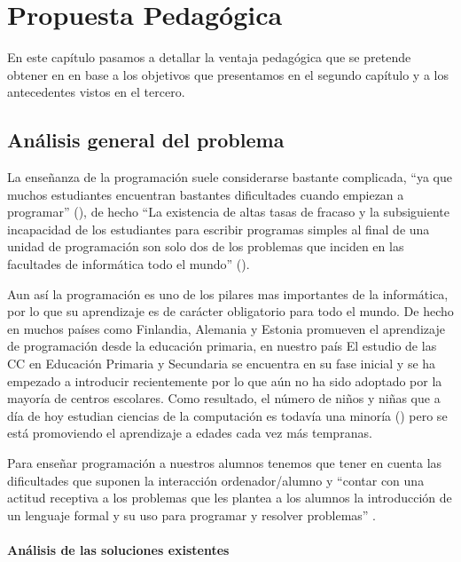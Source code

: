 \chapter{Propuesta Pedagógica}

En este capítulo pasamos a detallar la ventaja pedagógica que se pretende obtener en en base a los objetivos que presentamos en el segundo capítulo y a los antecedentes vistos en el tercero.

\section{Análisis general del problema}

La enseñanza de la programación suele considerarse bastante complicada, ``ya que muchos estudiantes encuentran bastantes dificultades cuando empiezan a programar'' (\cite{rubio_uso_2018}), de hecho ``La existencia de altas tasas de fracaso y la subsiguiente incapacidad de los estudiantes para escribir programas simples al final de una unidad de programación son solo dos de los problemas que inciden en las facultades de informática todo el mundo'' (\cite{bruce_contemporary_nodate}).

\bigskip
Aun así la programación es uno de los pilares mas importantes de la informática, por lo que su aprendizaje es de carácter obligatorio para todo el mundo. De hecho en muchos países como Finlandia, Alemania y Estonia promueven el aprendizaje de programación desde la educación primaria, en nuestro país El estudio de las CC en Educación Primaria y Secundaria se encuentra en su fase inicial y se ha
empezado a introducir recientemente por lo que aún no ha sido adoptado por la mayoría de centros escolares. Como resultado, el número de niños y niñas que a día de hoy estudian ciencias de la computación es
todavía una minoría (\cite{fecyt_educacion_2016}) pero se está promoviendo el aprendizaje a edades cada vez más tempranas.

\bigskip
Para enseñar programación a nuestros alumnos tenemos que tener en cuenta las dificultades que suponen la interacción ordenador/alumno y ``contar con una actitud receptiva a los problemas que les plantea a los alumnos la introducción de un lenguaje formal y su uso para programar y resolver problemas'' \cite{vitale_psycopedagogical_1990}.

\subsubsection*{Análisis de las soluciones existentes}

